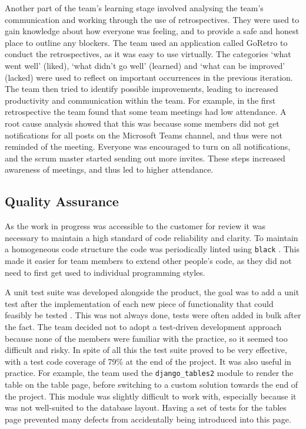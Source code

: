 \documentclass{l3proj}
\begin{document}
Another part of the team's learning stage involved analysing the team's communication and working through the use of retrospectives. They were used to gain knowledge about how everyone was feeling, and to provide a safe and honest place to outline any blockers. The team used an application called GoRetro \cite{GoRetro} to conduct the retrospectives, as it was easy to use virtually. The categories `what went well' (liked), `what didn't go well' (learned) and `what can be improved' (lacked) were used to reflect on important occurrences in the previous iteration. The team then tried to identify possible improvements, leading to increased productivity and communication within the team. For example, in the first retrospective the team found that some team meetings had low attendance. A root cause analysis showed that this was because some members did not get notifications for all posts on the Microsoft Teams channel, and thus were not reminded of the meeting. Everyone was encouraged to turn on all notifications, and the scrum master started sending out more invites. These steps increased awareness of meetings, and thus led to higher attendance.

\subsection{Quality Assurance}
\label{subsec:qa}
As the work in progress was accessible to the customer for review it was necessary to maintain a high standard of code reliability and clarity. To maintain a homogeneous code structure the code was periodically linted using \texttt{black} \cite{black}. This made it easier for team members to extend other people's code, as they did not need to first get used to individual programming styles.

A unit test suite was developed alongside the product, the goal was to add a unit test after the implementation of each new piece of functionality that could feasibly be tested \cite{UnitTest}. This was not always done, tests were often added in bulk after the fact. The team decided not to adopt a test-driven development approach because none of the members were familiar with the practice, so it seemed too difficult and risky. In spite of all this the test suite proved to be very effective, with a test code coverage of 79\% at the end of the project. It was also useful in practice. For example, the team used the \texttt{django\_tables2} module to render the table on the table page, before switching to a custom solution towards the end of the project. This module was slightly difficult to work with, especially because it was not well-suited to the database layout. Having a set of tests for the tables page prevented many defects from accidentally being introduced into this page.
\end{document}
